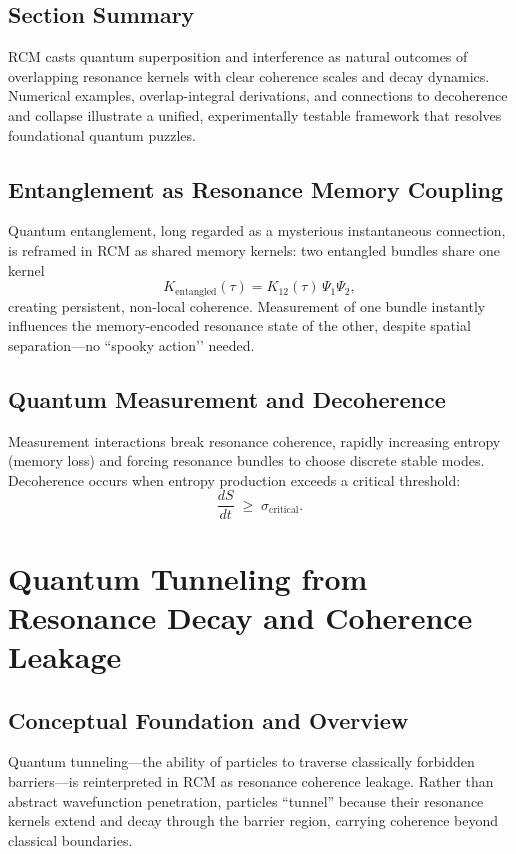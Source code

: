 \subsection{Section Summary}

RCM casts quantum superposition and interference as natural outcomes of overlapping resonance kernels with clear coherence scales and decay dynamics.  Numerical examples, overlap-integral derivations, and connections to decoherence and collapse illustrate a unified, experimentally testable framework that resolves foundational quantum puzzles.


\subsection{Entanglement as Resonance Memory Coupling}

Quantum entanglement, long regarded as a mysterious instantaneous connection,
is reframed in RCM as shared memory kernels:  
two entangled bundles share one kernel
\[
K_{\text{entangled}}(\tau)=K_{12}(\tau)\,\Psi_1\Psi_2,
\]
creating persistent, non-local coherence.  
Measurement of one bundle instantly influences the memory-encoded resonance
state of the other, despite spatial separation—no “spooky action’’ needed.

\subsection{Quantum Measurement and Decoherence}

Measurement interactions break resonance coherence, rapidly increasing
entropy (memory loss) and forcing resonance bundles to choose discrete stable
modes.  
Decoherence occurs when entropy production exceeds a critical threshold:
\[
\frac{dS}{dt} \;\ge\; \sigma_{\text{critical}}.
\]

\section{Quantum Tunneling from Resonance Decay and Coherence Leakage}

\subsection{Conceptual Foundation and Overview}

Quantum tunneling—the ability of particles to traverse classically forbidden barriers—is reinterpreted in RCM as resonance coherence leakage.  Rather than abstract wavefunction penetration, particles “tunnel” because their resonance kernels extend and decay through the barrier region, carrying coherence beyond classical boundaries.

